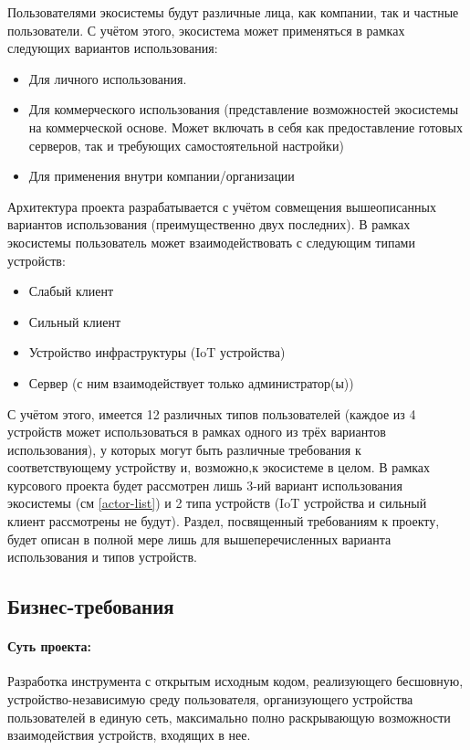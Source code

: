 Пользователями экосистемы будут различные лица, как компании, так и частные пользователи. С учётом этого, экосистема может применяться в рамках следующих вариантов использования:
\begin{itemize}
   \item Для личного использования.
   \item Для коммерческого использования (представление возможностей экосистемы на коммерческой основе. Может включать в себя как предоставление готовых серверов, так и требующих самостоятельной настройки)
   \item Для применения внутри компании/организации
         \label{actor-list}
\end{itemize}
Архитектура проекта разрабатывается с учётом совмещения вышеописанных вариантов использования (преимущественно двух последних).
В рамках экосистемы пользователь может взаимодействовать с следующим типами устройств:
\begin{itemize}
   \item Слабый клиент
   \item Сильный клиент
   \item Устройство инфраструктуры (IoT устройства)
   \item Сервер (с ним взаимодействует только администратор(ы))
\end{itemize}

С учётом этого, имеется 12 различных типов пользователей (каждое из 4 устройств может использоваться в рамках одного из трёх вариантов использования), у которых могут быть различные требования к соответствующему устройству и, возможно,к экосистеме в целом.
В рамках курсового проекта будет рассмотрен лишь 3-ий вариант использования экосистемы (см \ref{actor-list}) и 2 типа устройств (IoT устройства и сильный клиент рассмотрены не будут). Раздел, посвященный требованиям к проекту, будет описан в полной мере лишь для вышеперечисленных варианта использования и типов устройств.

\subsection*{Бизнес-требования}
\paragraph*{Суть проекта:}
Разработка инструмента с открытым исходным кодом, реализующего бесшовную, устройство-независимую среду пользователя, организующего устройства пользователей в единую сеть, максимально полно раскрывающую возможности взаимодействия устройств, входящих в нее.

